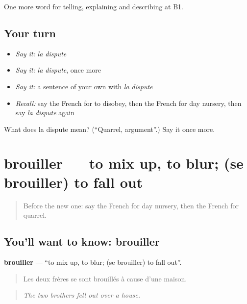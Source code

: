 \begin{grammarlens}[title={What you've built}]
One more word for telling, explaining and describing at B1.
\end{grammarlens}

\subsection*{Your turn}
\begin{itemize}
\raggedright
  \item \emph{Say it:} \emph{la dispute}
  \item \emph{Say it:} \emph{la dispute}, once more
  \item \emph{Say it:} a sentence of your own with \emph{la dispute}
  \item \emph{Recall:} say the French for to disobey, then the French for day nursery, then say \emph{la dispute} again
\end{itemize}

\begin{tcolorbox}[breakable,colback=teal!4,colframe=teal!35!black,title={Before you move on}]
What does la dispute mean? (\textquotedblleft{}Quarrel, argument\textquotedblright{}.) Say it once more.
\end{tcolorbox}
\section[brouiller]{brouiller — to mix up, to blur; (se brouiller) to fall out}

\label{lesson:FR-C495-brouiller}



\begin{quote}
Before the new one: say the French for day nursery, then the French for quarrel.
\end{quote}

\subsection*{You'll want to know: brouiller}
\textbf{brouiller} — \textquotedblleft{}to mix up, to blur; (se brouiller) to fall out\textquotedblright{}.

\begin{quote}
Les deux frères se sont brouillés à cause d'une maison.
\end{quote}

\begin{quote}
\emph{The two brothers fell out over a house.}
\end{quote}

